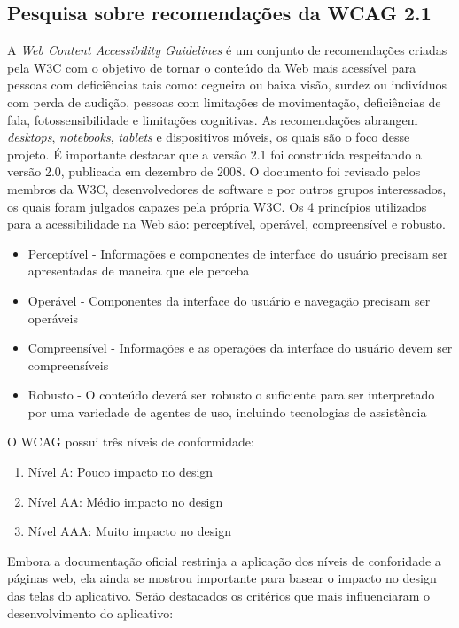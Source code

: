 \subsection{Pesquisa sobre recomendações da WCAG 2.1}
A \textit{Web Content Accessibility Guidelines} \citep{wcag} é um conjunto de recomendações criadas pela \href{https://www.w3.org/}{W3C} com o objetivo de tornar o conteúdo da Web mais acessível para pessoas com deficiências tais como: cegueira ou baixa visão, surdez ou indivíduos com perda de audição, pessoas com limitações de movimentação, deficiências de fala, fotossensibilidade e limitações cognitivas. As recomendações abrangem \textit{desktops}, \textit{notebooks}, \textit{tablets} e dispositivos móveis, os quais são o foco desse projeto. É importante destacar que a versão 2.1 foi construída respeitando a versão 2.0, publicada em dezembro de 2008. O documento foi revisado pelos membros da W3C, desenvolvedores de software e por outros grupos interessados, os quais foram julgados capazes pela própria W3C. Os 4 princípios utilizados para a acessibilidade na Web são: perceptível, operável, compreensível e robusto.
\begin{itemize}
    \item Perceptível - Informações e componentes de interface do usuário precisam ser apresentadas de maneira que ele perceba
    \item Operável - Componentes da interface do usuário e navegação precisam ser operáveis
    \item Compreensível - Informações e as operações da interface do usuário devem ser compreensíveis
    \item Robusto - O conteúdo deverá ser robusto o suficiente para ser interpretado por uma variedade de agentes de uso, incluindo tecnologias de assistência
\end{itemize}

O WCAG possui três níveis de conformidade:
\begin{enumerate}
    \item Nível A: Pouco impacto no design
    \item Nível AA: Médio impacto no design
    \item Nível AAA: Muito impacto no design
\end{enumerate}

Embora a documentação oficial restrinja a aplicação dos níveis de conforidade a páginas web, ela ainda se mostrou importante para basear o impacto no design das telas do aplicativo. 
Serão destacados os critérios que mais influenciaram o desenvolvimento do aplicativo:

